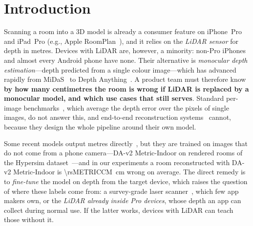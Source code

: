 \section{Introduction}\label{sec:intro}

Scanning a room into a 3D model is already a consumer feature on iPhone~Pro and iPad~Pro (e.g., Apple
RoomPlan~\cite{roomplan}), and it relies on the \emph{LiDAR sensor} for depth in metres. Devices with LiDAR are,
however, a minority: non-Pro iPhones and almost every Android phone have none. Their alternative is \emph{monocular
depth estimation}---depth predicted from a single colour image---which has advanced rapidly from MiDaS~\cite{midas} to
Depth Anything~\cite{da1,da2}. A product team must therefore know \textbf{by how many centimetres the room is wrong if
LiDAR is replaced by a monocular model, and which use cases that still serves}. Standard per-image
benchmarks~\cite{eigen14}, which average the depth error over the pixels of single images, do not answer this, and
end-to-end reconstruction systems~\cite{atlas,neuralrecon,simplerecon} cannot, because they design the whole pipeline
around their own model.

Some recent models output metres directly~\cite{da2,zoedepth,depthpro}, but they are trained on images that do not
come from a phone camera---DA-v2 Metric-Indoor on rendered rooms of the Hypersim dataset~\cite{hypersim}---and in our
experiments a room reconstructed with DA-v2 Metric-Indoor is \SI{\rsMETRICCM}{cm} wrong on average. The direct remedy
is to \emph{fine-tune} the model on depth from the target device, which raises the question of where these labels come
from: a survey-grade laser scanner~\cite{faro}, which few app makers own, or the \emph{LiDAR already inside Pro
devices}, whose depth an app can collect during normal use. If the latter works, devices with LiDAR can teach those
without it.

